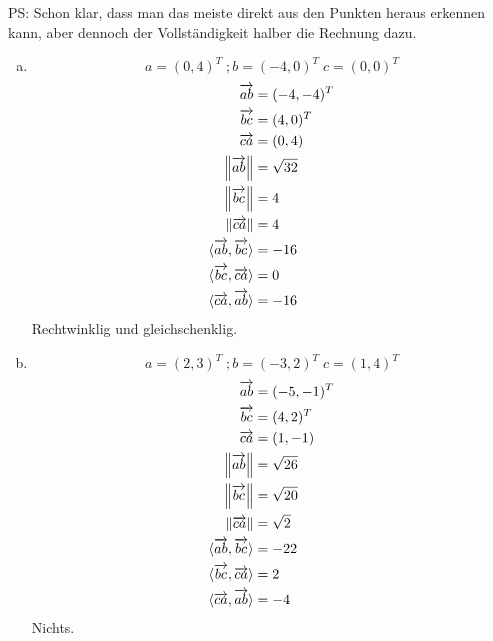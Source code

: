\documentclass{standalone}
\begin{document}
PS: Schon klar, dass man das meiste direkt aus den Punkten heraus erkennen kann, aber dennoch der Vollständigkeit halber die Rechnung dazu.

\begin{enumerate}[a)]
    \item $$ a = (0,4)^T \; ; b = (-4,0)^T \; c = (0,0)^T$$
    \begin{align}
        \overrightarrow{ab} &= (-4,-4)^T \\
        \overrightarrow{bc} &= (4, 0)^T \\
        \overrightarrow{ca} &= (0,4) \\
        \left\lVert\overrightarrow{ab}\right\rVert &= \sqrt{32} \\
        \left\lVert\overrightarrow{bc}\right\rVert &= 4 \\
        \left\lVert\overrightarrow{ca}\right\rVert &= 4 \\
        \langle \overrightarrow{ab}, \overrightarrow{bc} \rangle &= -16 \\
        \langle \overrightarrow{bc}, \overrightarrow{ca} \rangle &= 0 \\
        \langle \overrightarrow{ca}, \overrightarrow{ab} \rangle &= -16 \\
    \end{align}
    Rechtwinklig und gleichschenklig.

    \item $$ a = (2,3)^T \; ; b = (-3,2)^T \; c = (1,4)^T$$
    \begin{align}
        \overrightarrow{ab} &= (-5,-1)^T \\
        \overrightarrow{bc} &= (4, 2)^T \\
        \overrightarrow{ca} &= (1,-1) \\
        \left\lVert\overrightarrow{ab}\right\rVert &= \sqrt{26} \\
        \left\lVert\overrightarrow{bc}\right\rVert &= \sqrt{20} \\
        \left\lVert\overrightarrow{ca}\right\rVert &= \sqrt{2} \\
        \langle \overrightarrow{ab}, \overrightarrow{bc} \rangle &= -22 \\
        \langle \overrightarrow{bc}, \overrightarrow{ca} \rangle &= 2 \\
        \langle \overrightarrow{ca}, \overrightarrow{ab} \rangle &= -4 \\
    \end{align}
    Nichts.


\end{enumerate}
\end{document}
